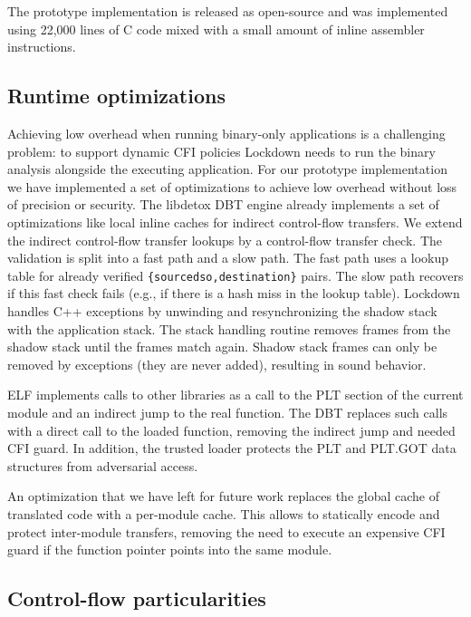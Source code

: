 \documentclass{acm_proc_article-sp}
\begin{document}
The prototype implementation is released as open-source and was implemented
using 22,000 lines of C code mixed with a small amount of inline assembler
instructions.




\subsection{Runtime optimizations}


Achieving low overhead when running binary-only applications is a challenging
problem: to support dynamic CFI policies Lockdown needs to run the binary
analysis alongside the executing application. For our prototype implementation
we have implemented a set of optimizations to achieve low overhead without loss
of precision or security.
The libdetox DBT engine already implements a set of optimizations like local
inline caches for indirect control-flow transfers. We extend the indirect
control-flow transfer lookups by a control-flow transfer check. The validation
is split into a fast path and a slow path. The fast path uses a lookup table for
already verified \texttt{\{sourcedso,destination\}} pairs. The slow path
recovers if this fast check fails (e.g., if there is a hash miss in the lookup
table).
Lockdown handles C++ exceptions by unwinding and resynchronizing the shadow
stack with the application stack. The stack handling routine removes frames from
the shadow stack until the frames match again. Shadow stack frames can only be
removed by exceptions (they are never added), resulting in sound behavior.

ELF implements calls to other libraries as a call to the PLT section of the
current module and an indirect jump to the real function. The DBT replaces such
calls with a direct call to the loaded function, removing the indirect jump and
needed CFI guard. In addition, the trusted loader protects the PLT and PLT.GOT
data structures from adversarial access.

An optimization that we have left for future work replaces the global cache of
translated code with a per-module cache. This allows to statically encode and
protect inter-module transfers, removing the need to execute an expensive CFI
guard if the function pointer points into the same module.


\subsection{Control-flow particularities}
\end{document}
